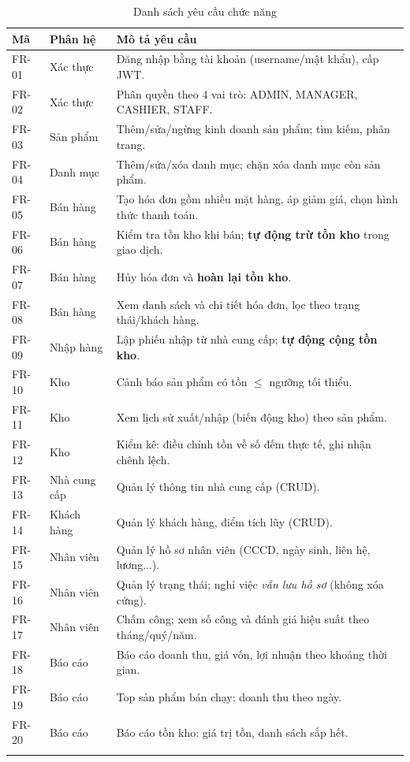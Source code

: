 \documentclass[12pt,a4paper]{report}
\begin{document}
\begin{longtable}{|L{1.4cm}|L{3cm}|L{8.5cm}|}
\hline
\textbf{Mã} & \textbf{Phân hệ} & \textbf{Mô tả yêu cầu} \\ \hline
\endhead
FR-01 & Xác thực & Đăng nhập bằng tài khoản (username/mật khẩu), cấp JWT. \\ \hline
FR-02 & Xác thực & Phân quyền theo 4 vai trò: ADMIN, MANAGER, CASHIER, STAFF. \\ \hline
FR-03 & Sản phẩm & Thêm/sửa/ngừng kinh doanh sản phẩm; tìm kiếm, phân trang. \\ \hline
FR-04 & Danh mục & Thêm/sửa/xóa danh mục; chặn xóa danh mục còn sản phẩm. \\ \hline
FR-05 & Bán hàng & Tạo hóa đơn gồm nhiều mặt hàng, áp giảm giá, chọn hình thức thanh toán. \\ \hline
FR-06 & Bán hàng & Kiểm tra tồn kho khi bán; \textbf{tự động trừ tồn kho} trong giao dịch. \\ \hline
FR-07 & Bán hàng & Hủy hóa đơn và \textbf{hoàn lại tồn kho}. \\ \hline
FR-08 & Bán hàng & Xem danh sách và chi tiết hóa đơn, lọc theo trạng thái/khách hàng. \\ \hline
FR-09 & Nhập hàng & Lập phiếu nhập từ nhà cung cấp; \textbf{tự động cộng tồn kho}. \\ \hline
FR-10 & Kho & Cảnh báo sản phẩm có tồn $\le$ ngưỡng tối thiểu. \\ \hline
FR-11 & Kho & Xem lịch sử xuất/nhập (biến động kho) theo sản phẩm. \\ \hline
FR-12 & Kho & Kiểm kê: điều chỉnh tồn về số đếm thực tế, ghi nhận chênh lệch. \\ \hline
FR-13 & Nhà cung cấp & Quản lý thông tin nhà cung cấp (CRUD). \\ \hline
FR-14 & Khách hàng & Quản lý khách hàng, điểm tích lũy (CRUD). \\ \hline
FR-15 & Nhân viên & Quản lý hồ sơ nhân viên (CCCD, ngày sinh, liên hệ, lương...). \\ \hline
FR-16 & Nhân viên & Quản lý trạng thái; nghỉ việc \emph{vẫn lưu hồ sơ} (không xóa cứng). \\ \hline
FR-17 & Nhân viên & Chấm công; xem số công và đánh giá hiệu suất theo tháng/quý/năm. \\ \hline
FR-18 & Báo cáo & Báo cáo doanh thu, giá vốn, lợi nhuận theo khoảng thời gian. \\ \hline
FR-19 & Báo cáo & Top sản phẩm bán chạy; doanh thu theo ngày. \\ \hline
FR-20 & Báo cáo & Báo cáo tồn kho: giá trị tồn, danh sách sắp hết. \\ \hline
\caption{Danh sách yêu cầu chức năng}
\end{longtable}
\end{document}
